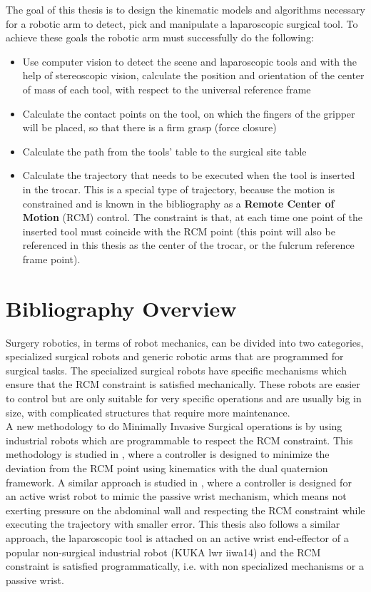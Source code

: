 The goal of this thesis is to design the kinematic models and algorithms necessary for a robotic arm to detect, pick and manipulate a laparoscopic surgical tool. To achieve these goals the robotic arm must 
successfully do the following:
\begin{itemize}
\item Use computer vision to detect the scene and laparoscopic tools and with the help of stereoscopic vision, calculate the position and orientation of the center of mass of each tool, with respect to the 
universal reference frame
\item Calculate the contact points on the tool, on which the fingers of the gripper will be placed, so that there is a firm grasp (force closure)
\item Calculate the path from the tools' table to the surgical site table
\item Calculate the trajectory that needs to be executed when the tool is inserted in the trocar. This is a special type of trajectory, because the motion is constrained and is known in the bibliography as
a \textbf{Remote Center of Motion} (RCM) control. The constraint is that, at each time one point of the inserted tool must coincide with the RCM point (this point will also be referenced in this thesis as the center of the 
trocar, or the fulcrum reference frame point).
\end{itemize}


\section{Bibliography Overview}

Surgery robotics, in terms of robot mechanics, can be divided into two categories, specialized surgical robots and generic robotic arms that are programmed for surgical tasks. The specialized surgical robots have specific 
mechanisms which ensure that the RCM constraint is satisfied mechanically. These robots are easier to control but are only suitable for very specific operations and are usually big in size, with complicated structures that 
require more maintenance.\\

A new methodology to do Minimally Invasive Surgical operations is by using industrial robots which are programmable to respect the RCM constraint. This methodology is studied in \cite{Marinho2014APR}, where a controller is designed to minimize 
the deviation from the RCM point using kinematics with the dual quaternion framework. A similar approach is studied in \cite{Bauzano2009ControlMF}, where a controller is designed for an active wrist robot to mimic the passive wrist mechanism, which 
means not exerting pressure on the abdominal wall and respecting the RCM constraint while executing the trajectory with smaller error. This thesis also follows a similar approach, the laparoscopic tool is attached on an 
active wrist end-effector of a popular non-surgical industrial robot (KUKA lwr iiwa14) and the RCM constraint is satisfied programmatically, i.e. with non specialized mechanisms or a passive wrist.\\

